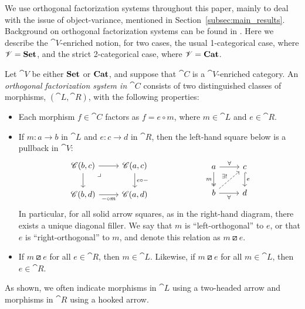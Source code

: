 \documentclass[11pt,oneside,article]{memoir}
\begin{document}
We use orthogonal factorization systems throughout this paper, mainly to deal with the issue of
object-variance, mentioned in Section~\ref{subsec:main_results}. Background on orthogonal
factorization systems can be found in \cite[Chapter 5.5]{BorceuxV1}. Here we describe the
$\cat{V}$-enriched notion, for two cases, the usual 1-categorical case, where $\mathscr{V}=\mathbf{Set}$, and
the strict 2-categorical case, where $\mathscr{V}=\mathbf{Cat}$.

\begin{definition}
      \label{def:orthogonal}
   Let $\cat{V}$ be either $\mathbf{Set}$ or $\mathbf{Cat}$, and suppose that $\cat{C}$ is a $\cat{V}$-enriched
   category. An \emph{orthogonal factorization system in $\cat{C}$} consists of two distinguished
   classes of morphisms, $(\cat{L},\cat{R})$, with the following properties:
   \begin{itemize}
      \item Each morphism $f\in\cat{C}$ factors as $f=e\circ m$, where $m\in\cat{L}$ and
         $e\in\cat{R}$.
      \item If $m\colon a\to b$ in $\cat{L}$ and $e\colon c\to d$ in $\cat{R}$, then the left-hand
         square below is a pullback in $\cat{V}$:
         \begin{equation}
               \label{eqn:OrthFactSys}
            \begin{tikzcd}
               \cat{C}(b,c)\ar[r]\ar[d]\ar[rd,phantom,"\lrcorner" very near start]&\cat{C}(a,c)\ar[d,"e\circ -"]\\
               \cat{C}(b,d)\ar[r,"-\circ m"']&\cat{C}(a,d)
            \end{tikzcd}
            \hspace{.9in}
            \begin{tikzcd}
               a\ar[r,"\forall"]\ar[d,two heads,"m"']&c\ar[d,hook, "e"]\\
               b\ar[r,"\forall"']\ar[ur,dashed,"\exists!"]&d
            \end{tikzcd}
         \end{equation}
         In particular, for all solid arrow squares, as in the right-hand diagram, there exists a
         unique diagonal filler. We say that $m$ is ``left-orthogonal'' to $e$, or that $e$ is
         ``right-orthogonal'' to $m$, and denote this relation as $m\boxslash e$.
      \item If $m\boxslash e$ for all $e\in\cat{R}$, then $m\in\cat{L}$. Likewise, if $m\boxslash e$
         for all $m\in\cat{L}$, then $e\in\cat{R}$.
   \end{itemize}
   As shown, we often indicate morphisms in $\cat{L}$ using a two-headed arrow and morphisms in
   $\cat{R}$ using a hooked arrow.
\end{definition}
\end{document}

